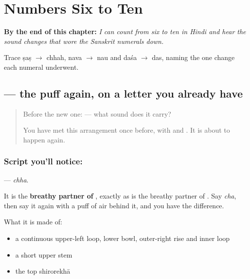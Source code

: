 
\chapter{Numbers Six to Ten}
\label{ch:hi-numbers-six-to-ten}

\begin{chapteropening}
\textbf{By the end of this chapter:} \emph{I can count from six to ten in Hindi and hear the sound changes that wore the Sanskrit numerals down.}

Trace ṣaṣ $\to$ chhah, nava $\to$ nau and daśa $\to$ das, naming the one change each numeral underwent.
\end{chapteropening}

\section[\texorpdfstring{\hi{छ} (chha)}{छ (chha)}]{ — the puff again, on a letter you already have}

\label{lesson:HI-S130-letter-chha}



\begin{quote}
Before the new one: \textbf{} — what sound does it carry?

You have met this arrangement once before, with \textbf{} and \textbf{}. It is about to happen again.
\end{quote}

\subsection*{Script you'll notice: }
\textbf{} — \emph{chha}.

It is the \textbf{breathy partner of }, exactly as \textbf{} is the breathy partner of \textbf{}. Say \emph{cha}, then say it again with a puff of air behind it, and you have the difference.

What it is made of:

\begin{itemize}
\raggedright
  \item a continuous upper-left loop, lower bowl, outer-right rise and inner loop
  \item a short upper stem
  \item the top shirorekhā
\end{itemize}

